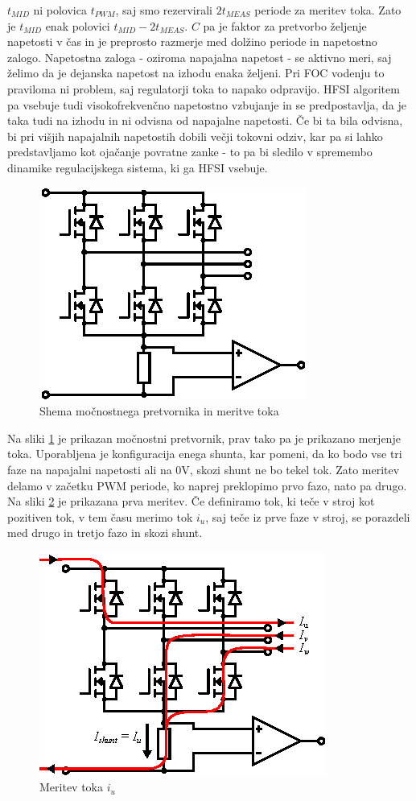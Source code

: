 \documentclass[a4paper,twoside,openright,12pt,slovene]{book}
\begin{document}
$t_{MID}$ ni polovica $t_{PWM}$, saj smo rezervirali $2t_{MEAS}$ periode za meritev toka. Zato je $t_{MID}$ enak polovici $t_{MID} - 2t_{MEAS}$. $C$ pa je faktor za pretvorbo željenje napetosti v
čas in je preprosto razmerje med dolžino periode in napetostno zalogo. Napetostna zaloga - oziroma napajalna napetost - se aktivno meri, saj želimo da je dejanska napetost na izhodu enaka željeni. Pri
FOC vodenju to praviloma ni problem, saj regulatorji toka to napako odpravijo. HFSI algoritem pa vsebuje tudi visokofrekvenčno napetostno vzbujanje in se predpostavlja, da je taka tudi na izhodu in ni
odvisna od napajalne napetosti. Če bi ta bila odvisna, bi pri višjih napajalnih napetostih dobili večji tokovni odziv, kar pa si lahko predstavljamo kot ojačanje povratne zanke - to pa bi sledilo v
spremembo dinamike regulacijskega sistema, ki ga HFSI vsebuje.

\begin{figure}[!htbp]
    \centering
    \includegraphics[width=0.5\columnwidth]{Slike/Inkscape/inverter.eps}
    \caption{\label{inverter} Shema močnostnega pretvornika in meritve toka }
\end{figure}

Na sliki \ref{inverter} je prikazan močnostni pretvornik, prav tako pa je prikazano merjenje toka. Uporabljena je konfiguracija enega shunta, kar pomeni, da ko bodo vse tri faze na napajalni
napetosti ali na 0V, skozi shunt ne bo tekel tok. Zato meritev delamo v začetku PWM periode, ko naprej preklopimo prvo fazo, nato pa drugo. Na sliki \ref{meritevTokaIu} je prikazana prva meritev.
Če definiramo tok, ki teče v stroj kot pozitiven tok, v tem času merimo tok $i_u$, saj teče iz prve faze v stroj, se porazdeli med drugo in tretjo fazo in skozi shunt. 

\begin{figure}[!htbp]
    \centering
    \includegraphics[width=0.5\columnwidth]{Slike/Inkscape/meritevTokaIu.eps}
    \caption{\label{meritevTokaIu} Meritev toka $i_u$ }
\end{figure}
\end{document}
